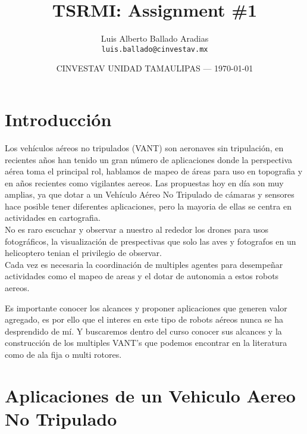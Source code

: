 \documentclass{article}
\title{TSRMI: Assignment \#1} %
\author{Luis Alberto Ballado Aradias\\ \texttt{luis.ballado@cinvestav.mx}} %
\date{CINVESTAV UNIDAD TAMAULIPAS --- \today} %
\begin{document}
\maketitle %


\section*{Introducción} %

Los vehículos aéreos no tripulados (VANT) son aeronaves sin tripulación, en recientes años han tenido un gran número de aplicaciones donde la perspectiva aérea toma el principal rol, hablamos de mapeo de áreas para uso en topografia y en años recientes como vigilantes aereos. Las propuestas hoy en día son muy amplias, ya que dotar a un Vehículo Aéreo No Tripulado de cámaras y sensores hace posible tener diferentes aplicaciones, pero la mayoria de ellas se centra en actividades en cartografia.\\

No es raro escuchar y observar a nuestro al rededor los drones para usos fotográficos, la visualización de prespectivas que solo las aves y fotografos en un helicoptero tenian el privilegio de observar.\\

Cada vez es necesaria la coordinación de multiples agentes para desempeñar actividades como el mapeo de areas y el dotar de autonomia a estos robots aereos.

\begin{info} %
  Es importante conocer los alcances y proponer aplicaciones que generen valor agregado, es por ello que el interes en este tipo de robots aéreos nunca se ha desprendido de mí. Y buscaremos dentro del curso conocer sus alcances y la construcción de los multiples VANT's que podemos encontrar en la literatura como de ala fija o multi rotores.
\end{info}


\section{Aplicaciones de un Vehiculo Aereo No Tripulado}
\end{document}
